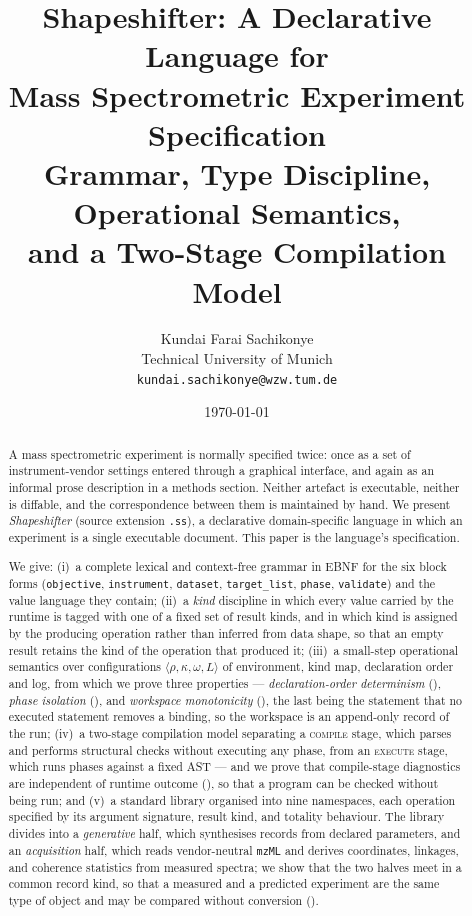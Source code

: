 \documentclass[11pt,twocolumn,a4paper]{article}
\title{\textbf{Shapeshifter: A Declarative Language for\\[3pt]
Mass Spectrometric Experiment Specification}\\[6pt]
\large Grammar, Type Discipline, Operational Semantics,\\
and a Two-Stage Compilation Model}
\author{%
Kundai Farai Sachikonye\\
\small Technical University of Munich\\
\small \texttt{kundai.sachikonye@wzw.tum.de}}
\date{\today}
\theoremstyle{ssthm}
\theoremstyle{definition}
\theoremstyle{remark}
\newcommand{\shk}[1]{\texttt{#1}}
\newcommand{\Env}{\rho}
\newcommand{\Kinds}{\kappa}
\newcommand{\Ord}{\omega}
\begin{document}
\maketitle

\begin{abstract}
\noindent
A mass spectrometric experiment is normally specified twice: once as a
set of instrument-vendor settings entered through a graphical interface,
and again as an informal prose description in a methods section. Neither
artefact is executable, neither is diffable, and the correspondence
between them is maintained by hand. We present \emph{Shapeshifter}
(source extension \shk{.ss}), a declarative domain-specific language in
which an experiment is a single executable document. This paper is the
language's specification.

We give: (i)~a complete lexical and context-free grammar in EBNF for the
six block forms (\shk{objective}, \shk{instrument}, \shk{dataset},
\shk{target\_list}, \shk{phase}, \shk{validate}) and the value language
they contain;
(ii)~a \emph{kind} discipline in which every value carried by the runtime
is tagged with one of a fixed set of result kinds, and in which kind is
assigned by the producing operation rather than inferred from data shape,
so that an empty result retains the kind of the operation that produced
it; (iii)~a small-step operational semantics over configurations
$\langle \Env, \Kinds, \Ord, L\rangle$ of environment, kind map,
declaration order and log, from which we prove three properties ---
\emph{declaration-order determinism} (),
\emph{phase isolation} (), and \emph{workspace
monotonicity} (), the last being the statement that no
executed statement removes a binding, so the workspace is an append-only
record of the run; (iv)~a two-stage compilation model separating a
\textsc{compile} stage, which parses and performs structural checks
without executing any phase, from an \textsc{execute} stage, which runs
phases against a fixed AST --- and we prove that compile-stage
diagnostics are independent of runtime outcome
(), so that a program can be checked without
being run; and (v)~a standard library organised into nine namespaces, each operation
specified by its argument signature, result kind, and totality
behaviour. The library divides into a \emph{generative} half, which
synthesises records from declared parameters, and an \emph{acquisition}
half, which reads vendor-neutral \shk{mzML} and derives coordinates,
linkages, and coherence statistics from measured spectra; we show that
the two halves meet in a common record kind, so that a measured and a
predicted experiment are the same type of object and may be compared
without conversion ().


\end{abstract}
\end{document}
